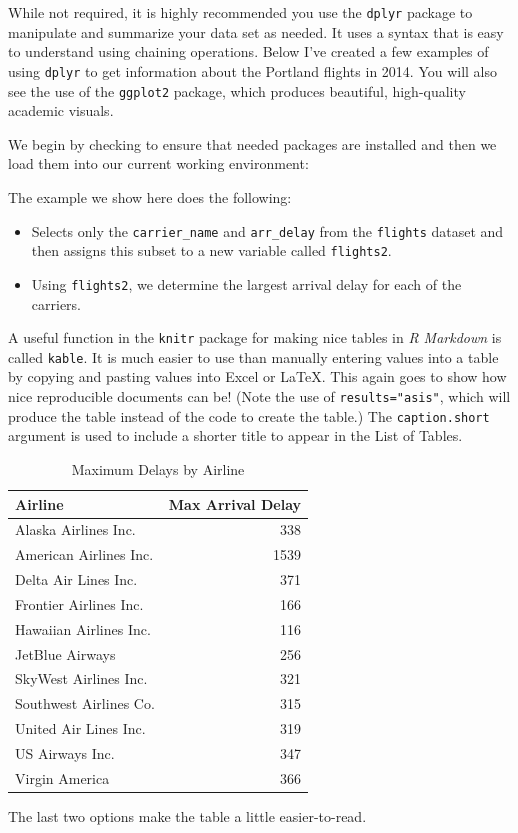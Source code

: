 \documentclass[12pt,twoside]{reedthesis}
\begin{document}
While not required, it is highly recommended you use the \texttt{dplyr} package to manipulate and summarize your data set as needed. It uses a syntax that is easy to understand using chaining operations. Below I've created a few examples of using \texttt{dplyr} to get information about the Portland flights in 2014. You will also see the use of the \texttt{ggplot2} package, which produces beautiful, high-quality academic visuals.

We begin by checking to ensure that needed packages are installed and then we load them into our current working environment:

\clearpage

The example we show here does the following:
\begin{itemize}
\item
  Selects only the \texttt{carrier\_name} and \texttt{arr\_delay} from the \texttt{flights} dataset and then assigns this subset to a new variable called \texttt{flights2}.
\item
  Using \texttt{flights2}, we determine the largest arrival delay for each of the carriers.
\end{itemize}
A useful function in the \texttt{knitr} package for making nice tables in \emph{R Markdown} is called \texttt{kable}. It is much easier to use than manually entering values into a table by copying and pasting values into Excel or LaTeX. This again goes to show how nice reproducible documents can be! (Note the use of \texttt{results="asis"}, which will produce the table instead of the code to create the table.) The \texttt{caption.short} argument is used to include a shorter title to appear in the List of Tables.
\begin{longtable}[t]{lr}
\caption[Max Delays by Airline]{\label{tab:maxdelays}Maximum Delays by Airline}\\
\toprule
Airline & Max Arrival Delay\\
\midrule
Alaska Airlines Inc. & 338\\
American Airlines Inc. & 1539\\
Delta Air Lines Inc. & 371\\
Frontier Airlines Inc. & 166\\
Hawaiian Airlines Inc. & 116\\
\addlinespace
JetBlue Airways & 256\\
SkyWest Airlines Inc. & 321\\
Southwest Airlines Co. & 315\\
United Air Lines Inc. & 319\\
US Airways Inc. & 347\\
\addlinespace
Virgin America & 366\\
\bottomrule
\end{longtable}
The last two options make the table a little easier-to-read.
\end{document}
